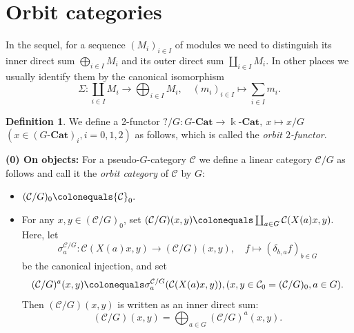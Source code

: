 \documentclass{surv-l}
\numberwithin{equation}{chapter}
\numberwithin{figure}{chapter}
\theoremstyle{plain}
\theoremstyle{definition}
\newtheorem{dfn}[thm]{Definition}
\theoremstyle{remark}
\newcommand{\kCat}{\Bbbk\text{-}\mathbf{Cat}}
\newcommand{\GCat}{G\text{-}\mathbf{Cat}}
\begin{document}
\section{Orbit categories}In the sequel, for a sequence $(M_i)_{i \in I}$ of modules we need to distinguish
its inner direct sum $\bigoplus_{i \in I} M_i$ and its outer direct sum $\coprod_{i \in I} M_i$.
In other places we usually identify them by the canonical isomorphism
\[
\Sigma \colon \coprod_{i \in I} M_i \to \bigoplus_{i \in I} M_i, \quad (m_i)_{i \in I} \mapsto \sum_{i \in I} m_i.
\]

\begin{dfn}\label{dfn:orbit-cat}
We define a 2-functor $?/G\colon \GCat \to \kCat, \ x \mapsto x/G$ $(x \in (\GCat)_i, i = 0,1,2)$
as follows, which is called the \emph{orbit $2$-functor}.

{\bf (0) On objects:}
For a pseudo-$G$-category ${\mathcal{C}}$ we define a linear category
${\mathcal{C}}/G$ as follows and call it the \emph{orbit category} of ${\mathcal{C}}$ by $G$:
\begin{itemize}
\item $({\mathcal{C}}/G)_0\colonequals {\mathcal{C}}_0.$
\item For any $x,y\in({\mathcal{C}}/G)_0$, set
$
({\mathcal{C}}/G)(x,y)\colonequals \coprod_{a\in G}{\mathcal{C}}(X(a) x, y).
$
Here, let
\[
\sigma^{{\mathcal{C}}/G}_a\colon {\mathcal{C}}(X(a) x, y) \to ({\mathcal{C}}/G)(x,y), \quad f \mapsto (\delta_{b,a} f)_{b \in G}
\]
be the canonical injection, and set
\begin{equation}\label{eq:hmg-part-orbit}
({\mathcal{C}}/G)^a(x,y)\colonequals \sigma^{{\mathcal{C}}/G}_a({\mathcal{C}}(X(a) x, y)), (x,y\in {\mathcal{C}}_0 = ({\mathcal{C}}/G)_0, a \in G).
\end{equation}
Then $({\mathcal{C}}/G)(x,y)$ is written as an inner direct sum:
\begin{equation}\label{eq:orbit-hmgsp}
({\mathcal{C}}/G)(x,y)=\bigoplus_{a\in G}({\mathcal{C}}/G)^a(x, y).
\end{equation}


\end{itemize}
\end{dfn}
\end{document}
